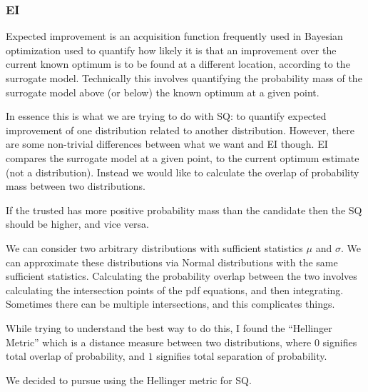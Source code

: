 \subsubsection{EI}
Expected improvement is an acquisition function frequently used in Bayesian optimization used to quantify how likely it is that an improvement over the current known optimum is to be found at a different location, according to the surrogate model. Technically this involves quantifying the probability mass of the surrogate model above (or below) the known optimum at a given point.

In essence this is what we are trying to do with SQ: to quantify expected improvement of one distribution related to another distribution. However, there are some non-trivial differences between what we want and EI though. EI compares the surrogate model at a given point, to the current optimum estimate (not a distribution). Instead we would like to calculate the overlap of probability mass between two distributions.

If the trusted has more positive probability mass than the candidate then the SQ should be higher, and vice versa.

We can consider two arbitrary distributions with sufficient statistics $\mu$ and $\sigma$. We can approximate these distributions via Normal distributions with the same sufficient statistics. Calculating the probability overlap between the two involves calculating the intersection points of the pdf equations, and then integrating. Sometimes there can be multiple intersections, and this complicates things.

While trying to understand the best way to do this, I found the ``Hellinger Metric'' which is a distance measure between two distributions, where $0$ signifies total overlap of probability, and $1$ signifies total separation of probability.

We decided to pursue using the Hellinger metric for SQ.
